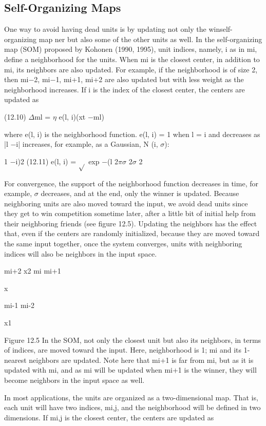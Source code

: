 \subsection{Self-Organizing Maps}

One way to avoid having dead units is by updating not only the winself-organizing map ner but also some of the other units as well. In the self-organizing map (SOM) proposed by Kohonen (1990, 1995), unit indices, namely, i as in mi, define a neighborhood for the units. When mi is the closest center, in addition to mi, its neighbors are also updated. For example, if the neighborhood is of size 2, then mi$-$2, mi$-$1, mi+1, mi+2 are also updated but with less weight as the neighborhood increases. If i is the index of the closest center, the centers are updated as

(12.10) $\Delta$ml = $\eta$ e(l, i)(xt $-$ml)

where e(l, i) is the neighborhood function. e(l, i) = 1 when l = i and decreases as |l $-$i| increases, for example, as a Gaussian, N (i, $\sigma$):

1 $-$i)2 (12.11) e(l, i) = $\sqrt{}$ exp $-$(l 2$\pi$$\sigma$ 2$\sigma$ 2

For convergence, the support of the neighborhood function decreases in time, for example, $\sigma$ decreases, and at the end, only the winner is updated. Because neighboring units are also moved toward the input, we avoid dead units since they get to win competition sometime later, after a little bit of initial help from their neighboring friends (see figure 12.5). Updating the neighbors has the effect that, even if the centers are randomly initialized, because they are moved toward the same input together, once the system converges, units with neighboring indices will also be neighbors in the input space.

mi+2 x2 mi mi+1

x

mi-1 mi-2

x1

Figure 12.5 In the SOM, not only the closest unit but also its neighbors, in terms of indices, are moved toward the input. Here, neighborhood is 1; mi and its 1-nearest neighbors are updated. Note here that mi+1 is far from mi, but as it is updated with mi, and as mi will be updated when mi+1 is the winner, they will become neighbors in the input space as well.

In most applications, the units are organized as a two-dimensional map. That is, each unit will have two indices, mi,j, and the neighborhood will be defined in two dimensions. If mi,j is the closest center, the centers are updated as

